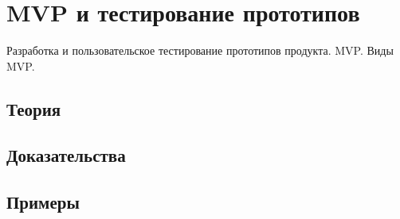 
\section{MVP и тестирование прототипов}
\label{sec:2.6.15-mvp-prototypes}

\begin{ticket}
Разработка и пользовательское тестирование прототипов продукта. MVP. Виды MVP.
\end{ticket}

\subsection*{Теория}

\subsection*{Доказательства}

\subsection*{Примеры}

